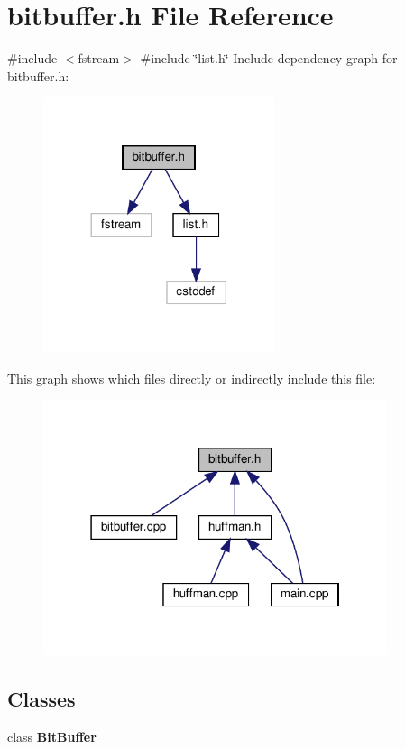 \section{bitbuffer.\+h File Reference}
\label{bitbuffer_8h}
{\ttfamily \#include $<$fstream$>$}\newline
{\ttfamily \#include \char`\"{}list.\+h\char`\"{}}\newline
Include dependency graph for bitbuffer.\+h\+:
\nopagebreak
\begin{figure}[H]
\begin{center}
\leavevmode
\includegraphics[width=192pt]{bitbuffer_8h__incl}
\end{center}
\end{figure}
This graph shows which files directly or indirectly include this file\+:
\nopagebreak
\begin{figure}[H]
\begin{center}
\leavevmode
\includegraphics[width=286pt]{bitbuffer_8h__dep__incl}
\end{center}
\end{figure}
\subsection*{Classes}
\begin{DoxyCompactItemize}
\item 
class \textbf{ Bit\+Buffer}
\end{DoxyCompactItemize}
